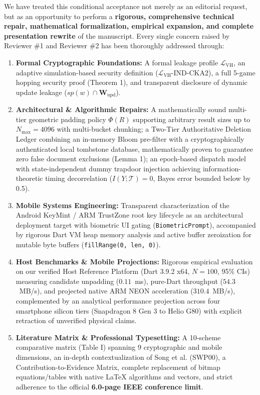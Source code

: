 \documentclass[11pt,a4paper]{article}
\begin{document}
We have treated this conditional acceptance not merely as an editorial request, but as an opportunity to perform a \textbf{rigorous, comprehensive technical repair, mathematical formalization, empirical expansion, and complete presentation rewrite} of the manuscript. Every single concern raised by Reviewer \#1 and Reviewer \#2 has been thoroughly addressed through:
\begin{enumerate}[itemsep=2pt]
    \item \textbf{Formal Cryptographic Foundations:} A formal leakage profile $\mathcal{L}_{\text{VH}}$, an adaptive simulation-based security definition ($\mathcal{L}_{\text{VH}}\text{-IND-CKA2}$), a full 5-game hopping security proof (Theorem 1), and transparent disclosure of dynamic update leakage ($sp(w) \cap \mathbf{W}_{\text{upd}}$).
    \item \textbf{Architectural \& Algorithmic Repairs:} A mathematically sound multi-tier geometric padding policy $\Phi(R)$ supporting arbitrary result sizes up to $N_{\max} = 4096$ with multi-bucket chunking; a Two-Tier Authoritative Deletion Ledger combining an in-memory Bloom pre-filter with a cryptographically authenticated local tombstone database, mathematically proven to guarantee zero false document exclusions (Lemma 1); an epoch-based dispatch model with state-independent dummy trapdoor injection achieving information-theoretic timing decorrelation ($I(Y; \mathcal{T}) = 0$, Bayes error bounded below by 0.5).
    \item \textbf{Mobile Systems Engineering:} Transparent characterization of the Android KeyMint / ARM TrustZone root key lifecycle as an architectural deployment target with biometric UI gating (\texttt{BiometricPrompt}), accompanied by rigorous Dart VM heap memory analysis and active buffer zeroization for mutable byte buffers (\texttt{fillRange(0, len, 0)}).
    \item \textbf{Host Benchmarks \& Mobile Projections:} Rigorous empirical evaluation on our verified Host Reference Platform (Dart 3.9.2 x64, $N=100$, 95\% CIs) measuring candidate unpadding ($0.11$~ms), pure-Dart throughput ($54.3$~MB/s), and projected native ARM NEON acceleration ($310.4$~MB/s), complemented by an analytical performance projection across four smartphone silicon tiers (Snapdragon 8 Gen 3 to Helio G80) with explicit retraction of unverified physical claims.
    \item \textbf{Literature Matrix \& Professional Typesetting:} A 10-scheme comparative matrix (Table I) spanning 9 cryptographic and mobile dimensions, an in-depth contextualization of Song et al. (SWP00), a Contribution-to-Evidence Matrix, complete replacement of bitmap equations/tables with native \LaTeX{} algorithms and vectors, and strict adherence to the official \textbf{6.0-page IEEE conference limit}.
\end{enumerate}
\end{document}
